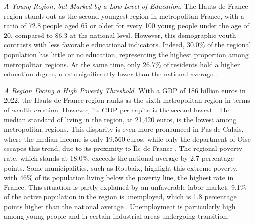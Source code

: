 \begin{refsegment}
\textsl{A Young Region, but Marked by a Low Level of Education}. The Hauts-de-France region stands out as the second youngest region in metropolitan France, with a ratio of 72.8 people aged 65 or older for every 100 young people under the age of 20, compared to 86.3 at the national level. However, this demographic youth contrasts with less favorable educational indicators. Indeed, 30.0\% of the regional population has little or no education, representing the highest proportion among metropolitan regions. At the same time, only 26.7\% of residents hold a higher education degree, a rate significantly lower than the national average \textcolor{blue}{\autocite{insee_essentiel_2024}}.%

\textsl{A Region Facing a High Poverty Threshold}. With a \acrfull{GDP} of 186 billion euros in 2022, the Hauts-de-France region ranks as the sixth metropolitan region in terms of wealth creation. However, its \acrshort{GDP} per capita is the second lowest \textcolor{blue}{\autocite{insee_essentiel_2024}}. The median standard of living in the region, at 21,420 euros, is the lowest among metropolitan regions. This disparity is even more pronounced in Pas-de-Calais, where the median income is only 19,560 euros, while only the department of Oise escapes this trend, due to its proximity to Île-de-France \textcolor{blue}{\autocite{ministere_de_la_culture_atlas_2023}}. The regional poverty rate, which stands at 18.0\%, exceeds the national average by 2.7 percentage points. Some municipalities, such as Roubaix, highlight this extreme poverty, with 46\% of its population living below the poverty line, the highest rate in France. This situation is partly explained by an unfavorable labor market: 9.1\% of the active population in the region is unemployed, which is 1.8 percentage points higher than the national average \textcolor{blue}{\autocite{insee_essentiel_2024}}. Unemployment is particularly high among young people and in certain industrial areas undergoing transition.%


\end{refsegment}
